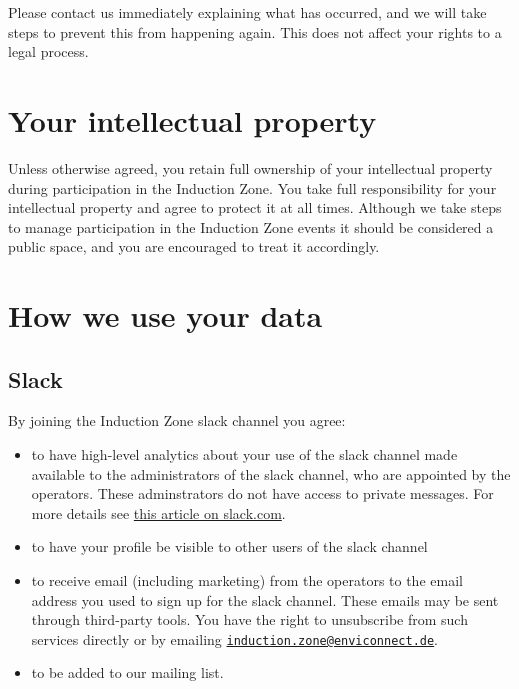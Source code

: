 \documentclass[
  10pt,
  a4paper,
]{article}
\providecommand{\tightlist}{%
  \setlength{\itemsep}{0pt}\setlength{\parskip}{0pt}}
\begin{document}
Please contact us immediately explaining what has occurred, and we will
take steps to prevent this from happening again. This does not affect
your rights to a legal process.

\hypertarget{your-intellectual-property}{%
\section{Your intellectual property}\label{your-intellectual-property}}

Unless otherwise agreed, you retain full ownership of your intellectual
property during participation in the Induction Zone. You take full
responsibility for your intellectual property and agree to protect it at
all times. Although we take steps to manage participation in the
Induction Zone events it should be considered a public space, and you
are encouraged to treat it accordingly.

\hypertarget{how-we-use-your-data}{%
\section{How we use your data}\label{how-we-use-your-data}}

\hypertarget{slack}{%
\subsection{Slack}\label{slack}}

By joining the Induction Zone slack channel you agree:

\begin{itemize}
\tightlist
\item
  to have high-level analytics about your use of the slack channel made
  available to the administrators of the slack channel, who are
  appointed by the operators. These adminstrators do not have access to
  private messages. For more details see
  \href{https://slack.com/help/articles/360047512554-Use-channel-management-tools}{this
  article on slack.com}.
\item
  to have your profile be visible to other users of the slack channel
\item
  to receive email (including marketing) from the operators to the email
  address you used to sign up for the slack channel. These emails may be
  sent through third-party tools. You have the right to unsubscribe from
  such services directly or by emailing
  \href{mailto:induction.zone@enviconnect.de}{\nolinkurl{induction.zone@enviconnect.de}}.
\item
  to be added to our mailing list.
\end{itemize}
\end{document}
